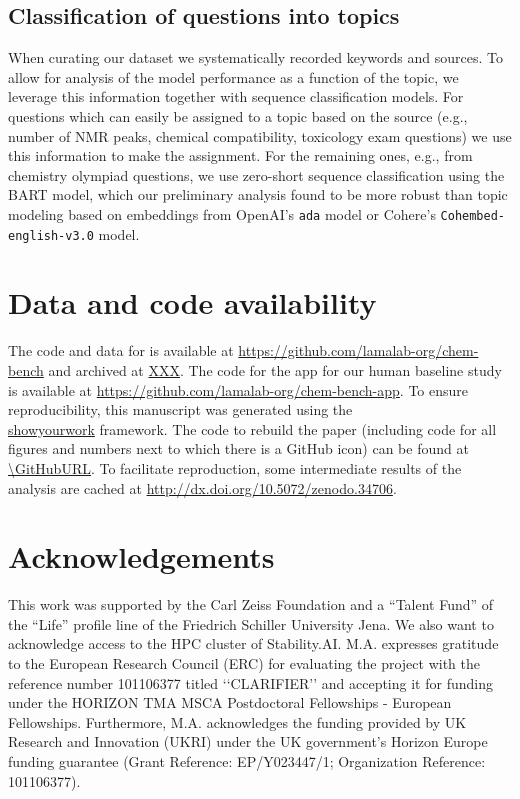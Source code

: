 \documentclass[11pt, oneside]{article}
\begin{document}
\begin{refsection}
\subsection{Classification of questions into topics}\label{sec:meth-topic} When curating our dataset we systematically recorded keywords and sources.
To allow for analysis of the model performance as a function of the topic, we leverage this information together with sequence classification models.
For questions which can easily be assigned to a topic based on the source (e.g., number of NMR peaks, chemical compatibility, toxicology exam questions) we use this information to make the assignment.
For the remaining ones, e.g., from chemistry olympiad questions, we use zero-short sequence classification\autocite{zeroshotsequence} using the BART model\autocite{bart, FacebookBART}, which our preliminary analysis found to be more robust than topic modeling based on embeddings from OpenAI's \texttt{ada} model or Cohere's \texttt{Cohembed-english-v3.0} model.


\section*{Data and code availability}
The code and data for \chembench is available at \url{https://github.com/lamalab-org/chem-bench} and archived at \url{XXX}.
The code for the app for our human baseline study is available at \url{https://github.com/lamalab-org/chem-bench-app}. 
To ensure reproducibility, this manuscript was generated using the \href{https://show-your.work/en/latest/}{\\showyourwork} framework.\autocite{Luger2021}
The code to rebuild the paper (including code for all figures and numbers next to which there is a GitHub icon) can be found at \url{\GitHubURL}. 
To facilitate reproduction, some intermediate results of the analysis are cached at \url{http://dx.doi.org/10.5072/zenodo.34706}.

\section*{Acknowledgements}
This work was supported by the Carl Zeiss Foundation and a \enquote{Talent Fund} of the \enquote{Life} profile line of the Friedrich Schiller University Jena.
We also want to acknowledge access to the HPC cluster of Stability.AI.
M.A. expresses gratitude to the European Research Council (ERC) for evaluating the project with the reference number 101106377 titled ‘‘CLARIFIER’’ and accepting it for funding under the HORIZON TMA MSCA Postdoctoral Fellowships - European Fellowships. 
Furthermore, M.A. acknowledges the funding provided by UK Research and Innovation (UKRI) under the UK government’s Horizon Europe funding guarantee (Grant Reference: EP/Y023447/1; Organization Reference: 101106377).


\end{refsection}
\end{document}
